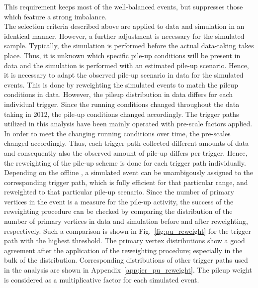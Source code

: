 This requirement keeps most of the well-balanced events, but suppresses those which feature a strong imbalance. \\
The selection criteria described above are applied to data and simulation in an identical manner. However, a further adjustment is necessary for the simulated sample. Typically, the simulation is performed before the actual data-taking takes place. Thus, it is unknown which specific pile-up conditions will be present in data and the simulation is performed with an estimated pile-up scenario. Hence, it is necessary to adapt the observed pile-up scenario in data for the simulated events. This is done by reweighting the simulated events to match the pileup conditions in data. However, the pileup distribution in data differs for each individual trigger. Since the running conditions changed throughout the data taking in 2012, the pile-up conditions changed accordingly. The trigger paths utilized in this analysis have been mainly operated with pre-scale factors applied. In order to meet the changing running conditions over time, the pre-scales changed accordingly. Thus, each trigger path collected different amounts of data and consequently also the observed amount of pile-up differs per trigger. Hence, the reweighting of the pile-up scheme is done for each trigger path individually. Depending on the offline \ptave, a simulated event can be unambigously assigned to the corresponding trigger path, which is fully efficient for that particular \pt range, and reweighted to that particular pile-up scenario. Since the number of primary vertices in the event is a measure for the pile-up activity, the success of the reweighting procedure can be checked by comparing the distribution of the number of primary vertices in data and simulation before and after reweighting, respectively. Such a comparison is shown in Fig.~\ref{fig:pu_reweight} for the trigger path with the highest \ptave threshold. The primary vertex distributions show a good agreement after the application of the reweighting procedure; especially in the bulk of the distribution. Corresponding distributions of other trigger paths used in the analysis are shown in Appendix~\ref{app:jer_pu_reweight}. The pileup weight is considered as a multiplicative factor for each simulated event. \\
